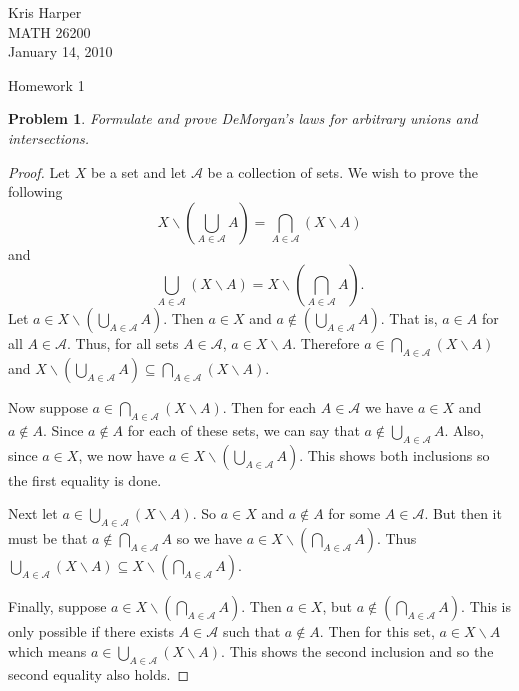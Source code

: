 \documentclass{article}
\newtheorem{problem}{Problem}
\begin{document}
\begin{flushright}
Kris Harper\\

MATH 26200\\

January 14, 2010
\end{flushright}

\begin{center}
Homework 1
\end{center}

\begin{problem}
Formulate and prove DeMorgan's laws for arbitrary unions and intersections.
\end{problem}
\begin{proof}
Let $X$ be a set and let $\mathcal{A}$ be a collection of sets. We wish to prove the following
\[
X \backslash \left ( \bigcup_{A \in \mathcal{A}} A \right ) = \bigcap_{A \in \mathcal{A}} (X \backslash A)
\]
and
\[
\bigcup_{A \in \mathcal{A}} (X \backslash A) = X \backslash \left ( \bigcap_{A \in \mathcal{A}} A \right ).
\]
Let $a \in X \backslash \left ( \bigcup_{A \in \mathcal{A}} A \right )$. Then $a \in X$ and $a \notin \left ( \bigcup_{A \in \mathcal{A}} A \right )$. That is, $a \in A$ for all $A \in \mathcal{A}$. Thus, for all sets $A \in \mathcal{A}$, $a \in X \backslash A$. Therefore $a \in \bigcap_{A \in \mathcal{A}} (X \backslash A)$ and $X \backslash \left ( \bigcup_{A \in \mathcal{A}} A \right ) \subseteq \bigcap_{A \in \mathcal{A}} (X \backslash A)$.

Now suppose $a \in \bigcap_{A \in \mathcal{A}} (X \backslash A)$. Then for each $A \in \mathcal{A}$ we have $a \in X$ and $a \notin A$. Since $a \notin A$ for each of these sets, we can say that $a \notin \bigcup_{A \in \mathcal{A}} A$. Also, since $a \in X$, we now have $a \in X \backslash \left ( \bigcup_{A \in \mathcal{A}} A \right )$. This shows both inclusions so the first equality is done.

Next let $a \in \bigcup_{A \in \mathcal{A}} (X \backslash A)$. So $a \in X$ and $a \notin A$ for some $A \in \mathcal{A}$. But then it must be that $a \notin \bigcap_{A \in \mathcal{A}} A$ so we have $a \in X \backslash \left ( \bigcap_{A \in \mathcal{A}} A \right )$. Thus $\bigcup_{A \in \mathcal{A}} (X \backslash A) \subseteq X \backslash \left ( \bigcap_{A \in \mathcal{A}} A \right )$.

Finally, suppose $a \in X \backslash \left ( \bigcap_{A \in \mathcal{A}} A \right )$. Then $a \in X$, but $a \notin \left ( \bigcap_{A \in \mathcal{A}} A \right )$. This is only possible if there exists $A \in \mathcal{A}$ such that $a \notin A$. Then for this set, $a \in X \backslash A$ which means $a \in \bigcup_{A \in \mathcal{A}} (X \backslash A)$. This shows the second inclusion and so the second equality also holds.
\end{proof}
\end{document}

